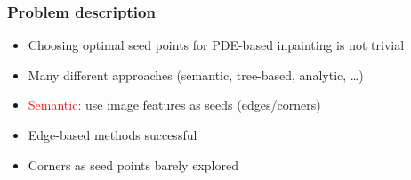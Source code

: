 \documentclass{beamer}
\newcommand{\red}[1]{\textcolor{red}{#1}}
\begin{document}
    \begin{frame}[t]
        \frametitle{Problem description}
        \begin{itemize}
            \item<+-> Choosing optimal seed points for PDE-based inpainting is not trivial
            \item<+-> Many different approaches (semantic, tree-based, analytic, \dots)
            \item<+-> \red{Semantic:} use image features as seeds (edges/corners)
            \item<+-> Edge-based methods successful
            \item<+-> Corners as seed points barely explored
        \end{itemize}
    \end{frame}
\end{document}
